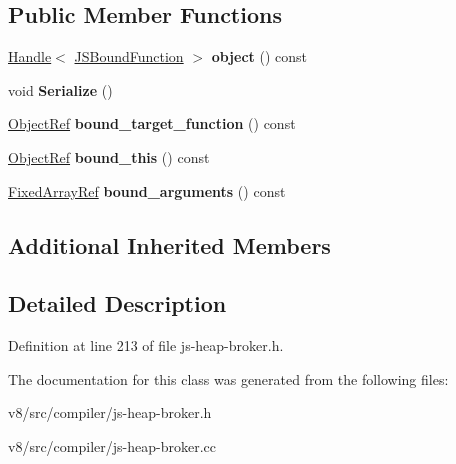 \subsection*{Public Member Functions}
\begin{DoxyCompactItemize}
\item 
\mbox{\label{classv8_1_1internal_1_1compiler_1_1JSBoundFunctionRef_a59df4dc4d6c0092d3f034271771dc19f}} 
\mbox{\hyperlink{classv8_1_1internal_1_1Handle}{Handle}}$<$ \mbox{\hyperlink{classv8_1_1internal_1_1JSBoundFunction}{J\+S\+Bound\+Function}} $>$ {\bfseries object} () const
\item 
\mbox{\label{classv8_1_1internal_1_1compiler_1_1JSBoundFunctionRef_ade7ffdaa2b4c4bfcc426498148fb7096}} 
void {\bfseries Serialize} ()
\item 
\mbox{\label{classv8_1_1internal_1_1compiler_1_1JSBoundFunctionRef_a45f8688f1f13dc42272a503af26a27ca}} 
\mbox{\hyperlink{classv8_1_1internal_1_1compiler_1_1ObjectRef}{Object\+Ref}} {\bfseries bound\+\_\+target\+\_\+function} () const
\item 
\mbox{\label{classv8_1_1internal_1_1compiler_1_1JSBoundFunctionRef_a6d80d753981ec4b70ba598aa6b9ddd4e}} 
\mbox{\hyperlink{classv8_1_1internal_1_1compiler_1_1ObjectRef}{Object\+Ref}} {\bfseries bound\+\_\+this} () const
\item 
\mbox{\label{classv8_1_1internal_1_1compiler_1_1JSBoundFunctionRef_abe8087dcf6fe4a6b883778fbd4f2df80}} 
\mbox{\hyperlink{classv8_1_1internal_1_1compiler_1_1FixedArrayRef}{Fixed\+Array\+Ref}} {\bfseries bound\+\_\+arguments} () const
\end{DoxyCompactItemize}
\subsection*{Additional Inherited Members}


\subsection{Detailed Description}


Definition at line 213 of file js-\/heap-\/broker.\+h.



The documentation for this class was generated from the following files\+:\begin{DoxyCompactItemize}
\item 
v8/src/compiler/js-\/heap-\/broker.\+h\item 
v8/src/compiler/js-\/heap-\/broker.\+cc\end{DoxyCompactItemize}
